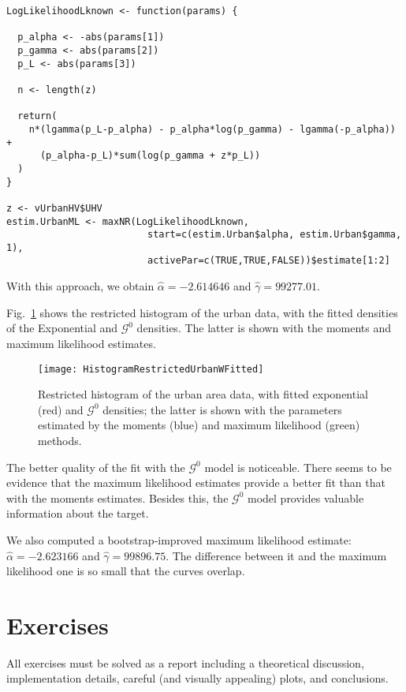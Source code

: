 \begin{lstlisting}[frame=tb]
LogLikelihoodLknown <- function(params) {
  
  p_alpha <- -abs(params[1])
  p_gamma <- abs(params[2])
  p_L <- abs(params[3])
  
  n <- length(z)
  
  return(
    n*(lgamma(p_L-p_alpha) - p_alpha*log(p_gamma) - lgamma(-p_alpha)) + 
      (p_alpha-p_L)*sum(log(p_gamma + z*p_L)) 
  )
}

z <- vUrbanHV$UHV
estim.UrbanML <- maxNR(LogLikelihoodLknown, 
                         start=c(estim.Urban$alpha, estim.Urban$gamma, 1), 
                         activePar=c(TRUE,TRUE,FALSE))$estimate[1:2]
\end{lstlisting}

With this approach, we obtain $\widehat{\alpha}=-2.614646$ and $\widehat\gamma=99277.01$.

Fig.~\ref{Fig:UrbanFitted} shows the restricted histogram of the urban data, with the fitted densities of the Exponential and $\mathcal G^0$ densities.
The latter is shown with the moments and maximum likelihood estimates.

\begin{figure}[hbt]
\centering
\texttt{[image: HistogramRestrictedUrbanWFitted]}
\caption{Restricted histogram of the urban area data, with fitted exponential (red) and $\mathcal G^0$ densities; the latter is shown with the parameters estimated by the moments (blue) and maximum likelihood (green) methods.}\label{Fig:UrbanFitted}
\end{figure}

The better quality of the fit with the $\mathcal G^0$ model is noticeable.
There seems to be evidence that the maximum likelihood estimates provide a better fit than that with the moments estimates.
Besides this, the $\mathcal G^0$ model provides valuable information about the target.

We also computed a bootstrap-improved maximum likelihood estimate:
$\widehat\alpha=-2.623166$ and $\widehat\gamma=99896.75$.
The difference between it and the maximum likelihood one is so small that the curves overlap.

\section*{Exercises}

All exercises must be solved as a report including a theoretical discussion, implementation details, careful (and visually appealing) plots, and conclusions.


